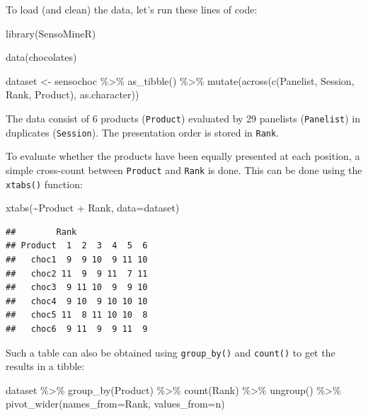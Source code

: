 \documentclass[
]{krantz}
\makeatletter
\newenvironment{Shaded}{\begin{snugshade}}{\end{snugshade}}
\newcommand{\AttributeTok}[1]{\textcolor[rgb]{0.61,0.61,0.61}{#1}}
\newcommand{\FunctionTok}[1]{\textcolor[rgb]{0,0,0}{#1}}
\newcommand{\NormalTok}[1]{#1}
\newcommand{\OtherTok}[1]{\textcolor[rgb]{0.37,0.37,0.37}{#1}}
\newcommand{\SpecialCharTok}[1]{\textcolor[rgb]{0,0,0}{#1}}
\newenvironment{kframe}{%
\medskip{}
\setlength{\fboxsep}{.8em}
 \def\at@end@of@kframe{}%
 \ifinner\ifhmode%
  \def\at@end@of@kframe{\end{minipage}}%
  \begin{minipage}{\columnwidth}%
 \fi\fi%
 \def\FrameCommand##1{\hskip\@totalleftmargin \hskip-\fboxsep
 \colorbox{shadecolor}{##1}\hskip-\fboxsep
     \hskip-\linewidth \hskip-\@totalleftmargin \hskip\columnwidth}%
 \MakeFramed {\advance\hsize-\width
   \@totalleftmargin\z@ \linewidth\hsize
   \@setminipage}}%
 {\par\unskip\endMakeFramed%
 \at@end@of@kframe}
\renewenvironment{Shaded}{\begin{kframe}}{\end{kframe}}
\makeatother
\begin{document}
To load (and clean) the data, let's run these lines of code:

\begin{Shaded}
\begin{Highlighting}[]
\FunctionTok{library}\NormalTok{(SensoMineR)}

\FunctionTok{data}\NormalTok{(chocolates)}

\NormalTok{dataset }\OtherTok{\textless{}{-}}\NormalTok{ sensochoc }\SpecialCharTok{\%\textgreater{}\%} 
  \FunctionTok{as\_tibble}\NormalTok{() }\SpecialCharTok{\%\textgreater{}\%} 
  \FunctionTok{mutate}\NormalTok{(}\FunctionTok{across}\NormalTok{(}\FunctionTok{c}\NormalTok{(Panelist, Session, Rank, Product), as.character))}
\end{Highlighting}
\end{Shaded}

The data consist of 6 products (\texttt{Product}) evaluated by 29 panelists (\texttt{Panelist}) in duplicates (\texttt{Session}). The presentation order is stored in \texttt{Rank}.

To evaluate whether the products have been equally presented at each position, a simple cross-count between \texttt{Product} and \texttt{Rank} is done. This can be done using the \texttt{xtabs()} function:

\begin{Shaded}
\begin{Highlighting}[]
\FunctionTok{xtabs}\NormalTok{(}\SpecialCharTok{\textasciitilde{}}\NormalTok{Product }\SpecialCharTok{+}\NormalTok{ Rank, }\AttributeTok{data=}\NormalTok{dataset)}
\end{Highlighting}
\end{Shaded}

\begin{verbatim}
##        Rank
## Product  1  2  3  4  5  6
##   choc1  9  9 10  9 11 10
##   choc2 11  9  9 11  7 11
##   choc3  9 11 10  9  9 10
##   choc4  9 10  9 10 10 10
##   choc5 11  8 11 10 10  8
##   choc6  9 11  9  9 11  9
\end{verbatim}

Such a table can also be obtained using \texttt{group\_by()} and \texttt{count()} to get the results in a tibble:

\begin{Shaded}
\begin{Highlighting}[]
\NormalTok{dataset }\SpecialCharTok{\%\textgreater{}\%} 
  \FunctionTok{group\_by}\NormalTok{(Product) }\SpecialCharTok{\%\textgreater{}\%} 
  \FunctionTok{count}\NormalTok{(Rank) }\SpecialCharTok{\%\textgreater{}\%} 
  \FunctionTok{ungroup}\NormalTok{() }\SpecialCharTok{\%\textgreater{}\%} 
  \FunctionTok{pivot\_wider}\NormalTok{(}\AttributeTok{names\_from=}\NormalTok{Rank, }\AttributeTok{values\_from=}\NormalTok{n)}
\end{Highlighting}
\end{Shaded}
\end{document}
